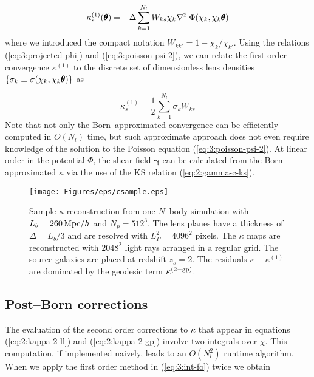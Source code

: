 \begin{equation}
\label{eq:3:kappa-fo-num-1}
\kappa^{(1)}_s(\pmb{\theta}) = -\Delta\sum_{k=1}^{N_l} W_{ks}\chi_k\nabla^2_\perp\Phi(\chi_k,\chi_k\pmb{\theta})
\end{equation} 
%
where we introduced the compact notation $W_{kk'}=1-\chi_k/\chi_{k'}$. Using the relations (\ref{eq:3:projected-phi}) and (\ref{eq:3:poisson-psi-2}), we can relate the first order convergence $\kappa^{(1)}$ to the discrete set of dimensionless lens densities $\{\sigma_k\equiv\sigma(\chi_k,\chi_k\pmb{\theta})\}$ as

\begin{equation}
\label{eq:3:kappa-fo-num-2}
\kappa^{(1)}_s = \frac{1}{2}\sum_{k=1}^{N_l} \sigma_k W_{ks}
\end{equation}
%
Note that not only the Born--approximated convergence can be efficiently computed in $O(N_l)$ time, but such approximate approach does not even require knowledge of the solution to the Poisson equation (\ref{eq:3:poisson-psi-2}). At linear order in the potential $\Phi$, the shear field $\pmb{\gamma}$ can be calculated from the Born--approximated $\kappa$ via the use of the KS relation (\ref{eq:2:gamma-c-ks}).  

\begin{figure}
\begin{center}
\texttt{[image: Figures/eps/csample.eps]}
\end{center}
\caption{Sample $\kappa$ reconstruction from one $N$--body simulation with $L_b=260\,{\rm Mpc}/h$ and $N_p=512^3$. The lens planes have a thickness of $\Delta=L_b/3$ and are resolved with $L_P^2=4096^2$ pixels. The $\kappa$ maps are reconstructed with $2048^2$ light rays arranged in a regular grid. The source galaxies are placed at redshift $z_s=2$. The residuals $\kappa-\kappa^{(1)}$ are dominated by the geodesic term $\kappa^{(2-{\rm gp})}$.}
\label{fig:3:csample}
\end{figure}

\subsection{Post--Born corrections}
The evaluation of the second order corrections to $\kappa$ that appear in equations (\ref{eq:2:kappa-2-ll}) and (\ref{eq:2:kappa-2-gp}) involve two integrals over $\chi$. This computation, if implemented naively, leads to an $O(N_l^2)$ runtime algorithm. When we apply the first order method in (\ref{eq:3:int-fo}) twice we obtain

